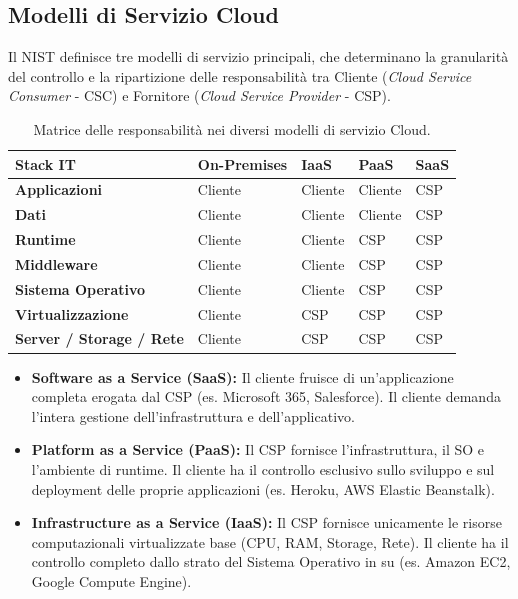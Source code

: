 \subsection{Modelli di Servizio Cloud}
Il NIST definisce tre modelli di servizio principali, che determinano la granularità del controllo e la ripartizione delle responsabilità tra Cliente (\textit{Cloud Service Consumer} - CSC) e Fornitore (\textit{Cloud Service Provider} - CSP).



\begin{table}[htbp]
\centering
\small
\begin{tabularx}{\textwidth}{@{}lXXXX@{}}
\toprule
\textbf{Stack IT} & \textbf{On-Premises} & \textbf{IaaS} & \textbf{PaaS} & \textbf{SaaS} \\ \midrule
\textbf{Applicazioni} & Cliente & Cliente & Cliente & CSP \\
\textbf{Dati} & Cliente & Cliente & Cliente & CSP \\
\textbf{Runtime} & Cliente & Cliente & CSP & CSP \\
\textbf{Middleware} & Cliente & Cliente & CSP & CSP \\
\textbf{Sistema Operativo} & Cliente & Cliente & CSP & CSP \\
\textbf{Virtualizzazione} & Cliente & CSP & CSP & CSP \\
\textbf{Server / Storage / Rete} & Cliente & CSP & CSP & CSP \\ \bottomrule
\end{tabularx}
\caption{Matrice delle responsabilità nei diversi modelli di servizio Cloud.}
\label{tab:cloud_service_models}
\end{table}

\begin{itemize}
    \item \textbf{Software as a Service (SaaS):} Il cliente fruisce di un'applicazione completa erogata dal CSP (es. Microsoft 365, Salesforce). Il cliente demanda l'intera gestione dell'infrastruttura e dell'applicativo.
    \item \textbf{Platform as a Service (PaaS):} Il CSP fornisce l'infrastruttura, il SO e l'ambiente di runtime. Il cliente ha il controllo esclusivo sullo sviluppo e sul deployment delle proprie applicazioni (es. Heroku, AWS Elastic Beanstalk).
    \item \textbf{Infrastructure as a Service (IaaS):} Il CSP fornisce unicamente le risorse computazionali virtualizzate base (CPU, RAM, Storage, Rete). Il cliente ha il controllo completo dallo strato del Sistema Operativo in su (es. Amazon EC2, Google Compute Engine).
\end{itemize}

